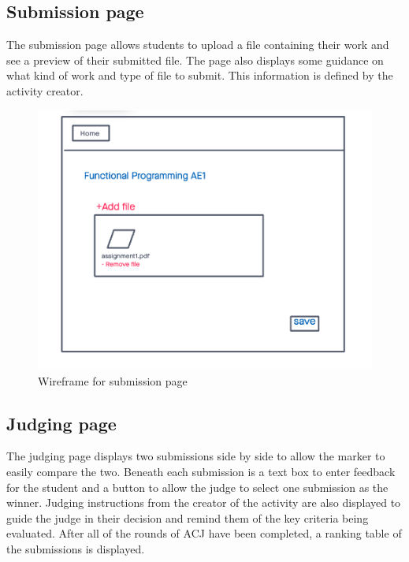 \documentclass{l4proj}
\begin{document}
\subsection{Submission page}
The submission page allows students to upload a file containing their work and see a preview of their submitted file. The page also displays some guidance on what kind of work and type of file to submit. This information is defined by the activity creator.

\begin{figure}[h]
\begin{center}
    \includegraphics[width=0.55\linewidth]{images/w-submission.png}    
    \caption{Wireframe for submission page}
\end{center}
\end{figure}

\subsection{Judging page}
The judging page displays two submissions side by side to allow the marker to easily compare the two. Beneath each submission is a text box to enter feedback for the student and a button to allow the judge to select one submission as the winner. Judging instructions from the creator of the activity are also displayed to guide the judge in their decision and remind them of the key criteria being evaluated. After all of the rounds of ACJ have been completed, a ranking table of the submissions is displayed.
\end{document}
